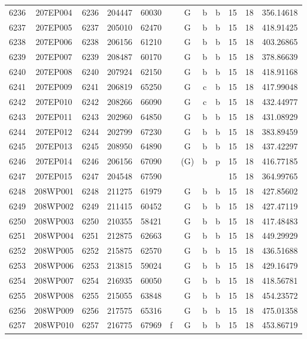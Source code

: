 \begin{tabular}{|*{12}{c|}}
6236 & 207EP004 & 6236 & 204447 & 60030 &  & G & b & b & 15 & 18 & 356.14618 \\ 
6237 & 207EP005 & 6237 & 205010 & 62470 &  & G & b & b & 15 & 18 & 418.91425 \\ 
6238 & 207EP006 & 6238 & 206156 & 61210 &  & G & b & b & 15 & 18 & 403.26865 \\ 
6239 & 207EP007 & 6239 & 208487 & 60170 &  & G & b & b & 15 & 18 & 378.86639 \\ 
6240 & 207EP008 & 6240 & 207924 & 62150 &  & G & b & b & 15 & 18 & 418.91168 \\ 
6241 & 207EP009 & 6241 & 206819 & 65250 &  & G & c & b & 15 & 18 & 417.99048 \\ 
6242 & 207EP010 & 6242 & 208266 & 66090 &  & G & c & b & 15 & 18 & 432.44977 \\ 
6243 & 207EP011 & 6243 & 202960 & 64850 &  & G & b & b & 15 & 18 & 431.08929 \\ 
6244 & 207EP012 & 6244 & 202799 & 67230 &  & G & b & b & 15 & 18 & 383.89459 \\ 
6245 & 207EP013 & 6245 & 208950 & 64890 &  & G & b & b & 15 & 18 & 437.42297 \\ 
6246 & 207EP014 & 6246 & 206156 & 67090 &  & (G) & b & p & 15 & 18 & 416.77185 \\ 
6247 & 207EP015 & 6247 & 204548 & 67590 &  &  &  &  & 15 & 18 & 364.99765 \\ 
6248 & 208WP001 & 6248 & 211275 & 61979 &  & G & b & b & 15 & 18 & 427.85602 \\ 
6249 & 208WP002 & 6249 & 211415 & 60452 &  & G & b & b & 15 & 18 & 427.47119 \\ 
6250 & 208WP003 & 6250 & 210355 & 58421 &  & G & b & b & 15 & 18 & 417.48483 \\ 
6251 & 208WP004 & 6251 & 212875 & 62663 &  & G & b & b & 15 & 18 & 449.29929 \\ 
6252 & 208WP005 & 6252 & 215875 & 62570 &  & G & b & b & 15 & 18 & 436.51688 \\ 
6253 & 208WP006 & 6253 & 213815 & 59024 &  & G & b & b & 15 & 18 & 429.16479 \\ 
6254 & 208WP007 & 6254 & 216935 & 60050 &  & G & b & b & 15 & 18 & 418.56781 \\ 
6255 & 208WP008 & 6255 & 215055 & 63848 &  & G & b & b & 15 & 18 & 454.23572 \\ 
6256 & 208WP009 & 6256 & 217575 & 65316 &  & G & b & b & 15 & 18 & 475.01358 \\ 
6257 & 208WP010 & 6257 & 216775 & 67969 & f & G & b & b & 15 & 18 & 453.86719 \\ 

\end{tabular}
